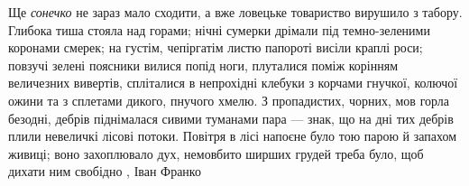 Ще \emph{сонечко} не зараз мало сходити, а вже ловецьке товариство вирушило з табору.
Глибока тиша стояла над горами; нічні сумерки дрімали під темно-зеленими
коронами смерек; на густім, чепіргатім листю папороті висіли краплі роси;
повзучі зелені поясники вилися попід ноги, плуталися поміж корінням величезних
вивертів, спліталися в непрохідні клебуки з корчами гнучкої, колючої ожини та з
сплетами дикого, пнучого хмелю. З пропадистих, чорних, мов горла безодні,
дебрів піднімалася сивими туманами пара — знак, що на дні тих дебрів плили
невеличкі лісові потоки. Повітря в лісі напоєне було тою парою й запахом
живиці; воно захоплювало дух, немовбито ширших грудей треба було, щоб дихати
ним свобідно
, Іван Франко
